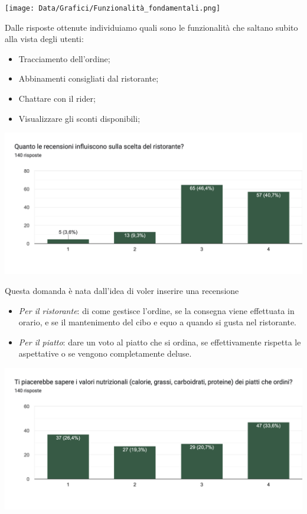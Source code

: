 \documentclass{article}
\begin{document}
\texttt{[image: Data/Grafici/Funzionalità\_fondamentali.png]}\par
Dalle risposte ottenute individuiamo quali sono le funzionalità che saltano subito alla vista degli utenti:
\par \begin{itemize}
    \item Tracciamento dell'ordine;
    \item Abbinamenti consigliati dal ristorante;
    \item Chattare con il rider;
    \item Visualizzare gli sconti disponibili;
\end{itemize}   \vspace{1cm} \par
\includegraphics[width=\textwidth]{Data/Grafici/recensioni_influiscono.png}\par
Questa domanda è nata dall'idea di voler inserire una recensione 
    \begin{itemize}
        \item \textit{Per il ristorante}: di come gestisce l'ordine, se la consegna viene effettuata in orario, e se il mantenimento del cibo e equo a quando si gusta nel ristorante.
        \item \textit{Per il piatto}: dare un voto al piatto che si ordina, se effettivamente rispetta le aspettative o se vengono completamente deluse.
    \end{itemize}
    \par \vspace{1cm}\includegraphics[width=\textwidth]{Data/Grafici/Valori_nutrizionali.png}\par
\end{document}
